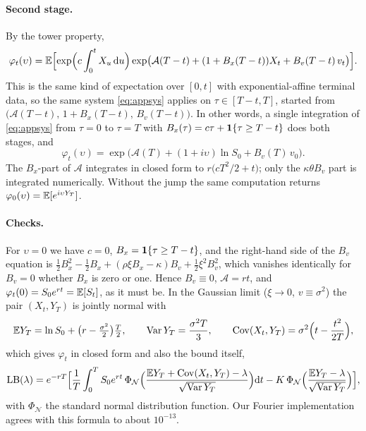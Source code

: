 \paragraph{Second stage.} By the tower property,
\begin{equation*}
\varphi_t(\upsilon) = \mathbb{E}\Bigl[\exp\Bigl(c\int_0^tX_u\,\mathrm{d} u\Bigr)
\exp\bigl(\mathcal A(T-t) + (1+B_x(T-t))X_t + B_v(T-t)\,v_t\bigr)\Bigr].
\end{equation*}
This is the same kind of expectation over $[0,t]$ with exponential-affine terminal data, so the same system
\eqref{eq:appsys} applies on $\tau\in[T-t,T]$, started from $\bigl(\mathcal A(T-t),\,1+B_x(T-t),\,B_v(T-t)\bigr)$.
In other words, a single integration of \eqref{eq:appsys} from $\tau=0$ to $\tau=T$ with
$B_x(\tau) = c\tau + \mathbf{1}\{\tau\ge T-t\}$ does both stages, and
\begin{equation*}
\varphi_t(\upsilon) = \exp\bigl(\mathcal A(T) + (1+i\upsilon)\ln S_0 + B_v(T)\,v_0\bigr).
\end{equation*}
The $B_x$-part of $\mathcal A$ integrates in closed form to $r\bigl(cT^2/2 + t\bigr)$; only the
$\kappa\theta B_v$ part is integrated numerically. Without the jump the same computation returns
$\varphi_0(\upsilon)=\mathbb{E}[e^{i\upsilon Y_T}]$.

\paragraph{Checks.} For $\upsilon=0$ we have $c=0$, $B_x=\mathbf{1}\{\tau\ge T-t\}$, and the right-hand side of
the $B_v$ equation is $\tfrac12B_x^2-\tfrac12B_x + (\rho\xi B_x-\kappa)B_v + \tfrac12\xi^2B_v^2$, which
vanishes identically for $B_v=0$ whether $B_x$ is zero or one. Hence $B_v\equiv0$, $\mathcal A = rt$, and
$\varphi_t(0)=S_0e^{rt}=\mathbb{E}[S_t]$, as it must be. In the Gaussian limit ($\xi\to0$, $v\equiv\sigma^2$) the pair
$(X_t,Y_T)$ is jointly normal with
\begin{equation*}
\mathbb{E} Y_T = \ln S_0 + \bigl(r-\tfrac{\sigma^2}{2}\bigr)\tfrac T2,\qquad
\operatorname{Var} Y_T = \frac{\sigma^2T}{3},\qquad
\operatorname{Cov}(X_t,Y_T) = \sigma^2\Bigl(t - \frac{t^2}{2T}\Bigr),
\end{equation*}
which gives $\varphi_t$ in closed form and also the bound itself,
\begin{equation*}
\mathrm{LB}(\lambda) = e^{-rT}\Bigl[\frac1T\int_0^T S_0e^{rt}\,
\Phi_{\mathcal N}\Bigl(\frac{\mathbb{E} Y_T + \operatorname{Cov}(X_t,Y_T) - \lambda}{\sqrt{\operatorname{Var}Y_T}}\Bigr)\mathrm{d} t
- K\,\Phi_{\mathcal N}\Bigl(\frac{\mathbb{E} Y_T-\lambda}{\sqrt{\operatorname{Var}Y_T}}\Bigr)\Bigr],
\end{equation*}
with $\Phi_{\mathcal N}$ the standard normal distribution function. Our Fourier implementation agrees with
this formula to about $10^{-13}$.

